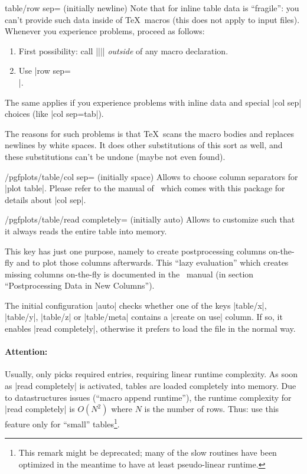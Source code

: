 {\begin{pgfplotskey}{table/row sep= (initially newline)}
	Note that  for inline table data is ``fragile'': you can't provide such data inside of \TeX\ macros (this does not apply to input files). Whenever you experience problems, proceed as follows:
	\begin{enumerate}
		\item First possibility: call |\pgfplotstableread||\yourmacro| \emph{outside} of any macro declaration.
		\item Use |row sep=\\|.
	\end{enumerate}
	The same applies if you experience problems with inline data and special |col sep| choices (like |col sep=tab|).

	The reasons for such problems is that \TeX\ scans the macro bodies and replaces newlines by white spaces. It does other substitutions of this sort as well, and these substitutions can't be undone (maybe not even found).
\end{pgfplotskey}

\begin{key}{/pgfplots/table/col sep= (initially space)}
	Allows to choose column separators for |plot table|. Please refer to the manual of \PGFPlotstable\ which comes with this package for details about |col sep|.
\end{key}
\begin{key}{/pgfplots/table/read completely= (initially auto)}
	Allows to customize  such that it always reads the entire table into memory.

	This key has just one purpose, namely to create postprocessing columns on-the-fly and to plot those columns afterwards. This ``lazy evaluation'' which creates missing columns on-the-fly is documented in the \PGFPlotstable\ manual (in section ``Postprocessing Data in New Columns'').

	The initial configuration |auto| checks whether one of the keys |table/x|, |table/y|, |table/z| or |table/meta| contains a |create on use| column. If so, it enables |read completely|, otherwise it prefers to load the file in the normal way.

	\paragraph{Attention:} Usually,  only picks required entries, requiring linear runtime complexity. As soon as |read completely| is activated, tables are loaded completely into memory. Due to datastructures issues (``macro append runtime''), the runtime complexity for |read completely| is $O(N^2)$ where $N$ is the number of rows. Thus: use this feature only for ``small'' tables\footnote{This remark might be deprecated; many of the slow routines have been optimized in the meantime to have at least pseudo-linear runtime.}.
\end{key}

}
